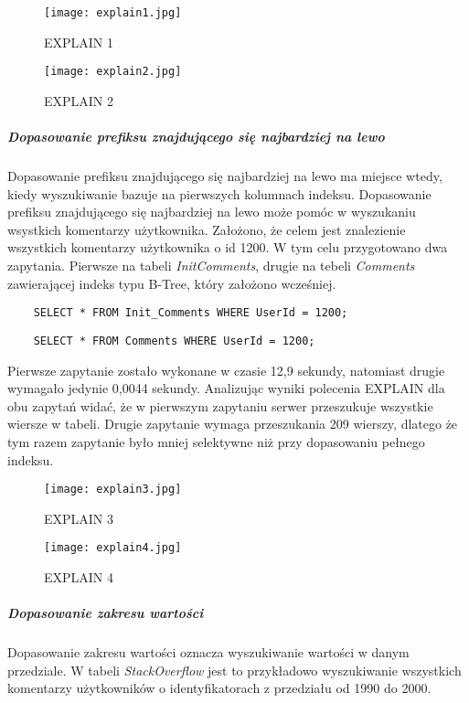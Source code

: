 \begin{figure}[h]
    \texttt{[image: explain1.jpg]} 
    \caption{EXPLAIN 1}
    \label{fig::explain1.jpg}
\end{figure}

\begin{figure}[h]
    \texttt{[image: explain2.jpg]} 
    \caption{EXPLAIN 2}
    \label{fig::explain2.jpg}
\end{figure}


\subparagraph{Dopasowanie prefiksu znajdującego się najbardziej na lewo}\mbox{} \newline
Dopasowanie prefiksu znajdującego się najbardziej na lewo ma miejsce wtedy, kiedy wyszukiwanie bazuje na pierwszych kolumnach indeksu.
Dopasowanie prefiksu znajdującego się najbardziej na lewo może pomóc w wyszukaniu wsystkich komentarzy użytkownika. Założono, że celem jest znalezienie wszystkich komentarzy użytkownika o id 1200.
W tym celu przygotowano dwa zapytania. Pierwsze na tabeli \textit{Init\textunderscore Comments}, drugie na tebeli \textit{Comments} zawierającej indeks typu B-Tree, który założono wcześniej.
\begin{verbatim}
    SELECT * FROM Init_Comments WHERE UserId = 1200;
\end{verbatim}
\begin{verbatim}
    SELECT * FROM Comments WHERE UserId = 1200;
\end{verbatim}
Pierwsze zapytanie zostało wykonane w czasie 12,9 sekundy, natomiast drugie wymagało jedynie 0,0044 sekundy. Analizując wyniki polecenia EXPLAIN dla obu zapytań widać, że w pierwszym zapytaniu serwer przeszukuje wszystkie wiersze w tabeli. Drugie zapytanie wymaga przeszukania 209 wierszy, dlatego że tym razem zapytanie było mniej selektywne niż przy dopasowaniu pełnego indeksu.
\begin{figure}[h]
    \texttt{[image: explain3.jpg]} 
    \caption{EXPLAIN 3}
\end{figure}

\begin{figure}[h]
    \texttt{[image: explain4.jpg]} 
    \caption{EXPLAIN 4}
\end{figure}

\subparagraph{Dopasowanie zakresu wartości}\mbox{} \newline
Dopasowanie zakresu wartości oznacza wyszukiwanie wartości w danym przedziale. W tabeli \textit{StackOverflow} jest to przykładowo wyszukiwanie wszystkich komentarzy użytkowników o identyfikatorach z przedziału od 1990 do 2000.

